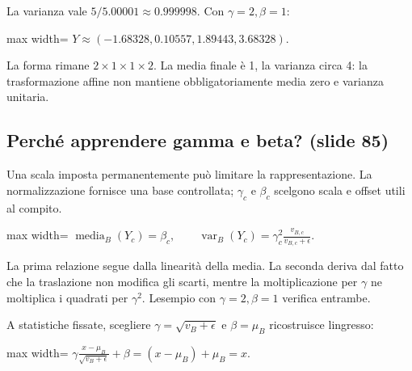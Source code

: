 \documentclass[11pt,a4paper,oneside,openany]{book}
\begin{document}
La varianza vale \(5/5.00001\approx0.999998\). Con \(\gamma=2,\beta=1\):

\begin{center}
\begin{adjustbox}{max width=\linewidth}
$\displaystyle \boxed{Y\approx(-1.68328,0.10557,1.89443,3.68328).}$
\end{adjustbox}
\end{center}

La forma rimane \(2\times1\times1\times2\). La media finale è 1, la varianza circa 4: la trasformazione affine non mantiene obbligatoriamente media zero e varianza unitaria.

\subsection{Perché apprendere gamma e beta? (slide 85)}\label{f02-r1209}

Una scala imposta permanentemente può limitare la rappresentazione. La normalizzazione fornisce una base controllata; \(\gamma_c\) e \(\beta_c\) scelgono scala e offset utili al compito.

\begin{center}
\begin{adjustbox}{max width=\linewidth}
$\displaystyle \boxed{\operatorname{media}_B(Y_c)=\beta_c,\qquad\operatorname{var}_B(Y_c)=\gamma_c^2\frac{v_{B,c}}{v_{B,c}+\epsilon}.}$
\end{adjustbox}
\end{center}

La prima relazione segue dalla linearità della media. La seconda deriva dal fatto che la traslazione non modifica gli scarti, mentre la moltiplicazione per \(\gamma\) ne moltiplica i quadrati per \(\gamma^2\). L\textquotesingle esempio con \(\gamma=2,\beta=1\) verifica entrambe.

A statistiche fissate, scegliere \(\gamma=\sqrt{v_B+\epsilon}\) e \(\beta=\mu_B\) ricostruisce l\textquotesingle ingresso:

\begin{center}
\begin{adjustbox}{max width=\linewidth}
$\displaystyle \gamma\frac{x-\mu_B}{\sqrt{v_B+\epsilon}}+\beta=(x-\mu_B)+\mu_B=x.$
\end{adjustbox}
\end{center}
\end{document}
